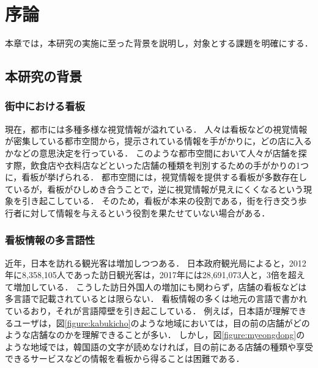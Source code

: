 \chapter{序論}
\label{chapter:introduction}

本章では，本研究の実施に至った背景を説明し，対象とする課題を明確にする．

\section{本研究の背景}
  \subsection{街中における看板}
    現在，都市には多種多様な視覚情報が溢れている．
    人々は看板などの視覚情報が密集している都市空間から，提示されている情報を手がかりに，どの店に入るかなどの意思決定を行っている．
    このような都市空間において人々が店舗を探す際，飲食店や衣料店などといった店舗の種類を判別するための手がかりの1つに，看板が挙げられる．
    都市空間には，視覚情報を提供する看板が多数存在しているが，看板がひしめき合うことで，逆に視覚情報が見えにくくなるという現象を引き起こしている\cite{Watanabe:2003}．
    そのため，看板が本来の役割である，街を行き交う歩行者に対して情報を与えるという役割を果たせていない場合がある．

  \subsection{看板情報の多言語性}
    近年，日本を訪れる観光客は増加しつつある．
    日本政府観光局によると，2012年に8,358,105人であった訪日観光客は，2017年には28,691,073人と，3倍を超えて増加している\cite{JNTO:2018}．
    こうした訪日外国人の増加にも関わらず，店舗の看板などは多言語で記載されているとは限らない．
    看板情報の多くは地元の言語で書かれているおり，それが言語障壁を引き起こしている．
    例えば，日本語が理解できるユーザは，図\ref{figure:kabukicho}のような地域においては，目の前の店舗がどのような店舗なのかを理解できることが多い．
    しかし，図\ref{figure:myeongdong}のような地域では，韓国語の文字が読めなければ，目の前にある店舗の種類や享受できるサービスなどの情報を看板から得ることは困難である．

